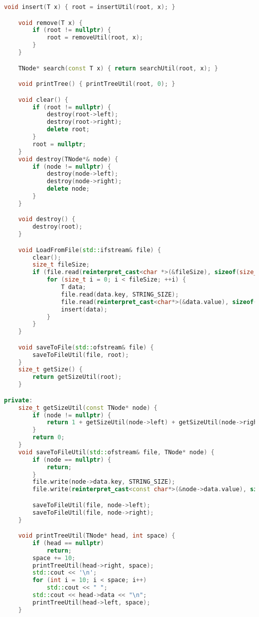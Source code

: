 \documentclass[12pt]{article}
\begin{document}
\begin{lstlisting}[language=C++]
    void insert(T x) { root = insertUtil(root, x); }

    void remove(T x) {
        if (root != nullptr) {
            root = removeUtil(root, x);
        }
    }

    TNode* search(const T x) { return searchUtil(root, x); }

    void printTree() { printTreeUtil(root, 0); }

    void clear() {
        if (root != nullptr) {
            destroy(root->left);
            destroy(root->right);
            delete root;
        }
        root = nullptr;
    }
    void destroy(TNode*& node) {
        if (node != nullptr) {
            destroy(node->left);
            destroy(node->right);
            delete node;
        }
    }

    void destroy() {
        destroy(root);
    }

    void LoadFromFile(std::ifstream& file) {
        clear();
        size_t fileSize;
        if (file.read(reinterpret_cast<char *>(&fileSize), sizeof(size_t))) {
            for (size_t i = 0; i < fileSize; ++i) {
                T data;
                file.read(data.key, STRING_SIZE);
                file.read(reinterpret_cast<char*>(&data.value), sizeof(data.value));
                insert(data);
            }
        }
    }

    void saveToFile(std::ofstream& file) {
        saveToFileUtil(file, root);
    }
    size_t getSize() {
        return getSizeUtil(root);
    }

private:
    size_t getSizeUtil(const TNode* node) {
        if (node != nullptr) {
            return 1 + getSizeUtil(node->left) + getSizeUtil(node->right);
        }
        return 0;
    }
    void saveToFileUtil(std::ofstream& file, TNode* node) {
        if (node == nullptr) {
            return;
        }
        file.write(node->data.key, STRING_SIZE);
        file.write(reinterpret_cast<const char*>(&node->data.value), sizeof(node->data.value));

        saveToFileUtil(file, node->left);
        saveToFileUtil(file, node->right);
    }

    void printTreeUtil(TNode* head, int space) {
        if (head == nullptr)
            return;
        space += 10;
        printTreeUtil(head->right, space);
        std::cout << '\n';
        for (int i = 10; i < space; i++)
            std::cout << " ";
        std::cout << head->data << "\n";
        printTreeUtil(head->left, space);
    }
    

\end{lstlisting}
\end{document}

